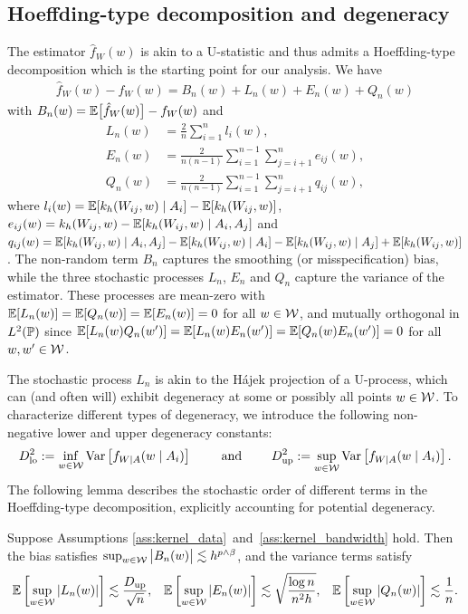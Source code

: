 \subsection{Hoeffding-type decomposition and degeneracy}
\label{sec:degeneracy}

The estimator $\hat{f}_W(w)$ is akin to a
U-statistic and thus admits a Hoeffding-type decomposition
which is the starting point for our analysis. We have
%
\begin{align}\label{eq:h-decomposition}
  \hat{f}_W(w) - f_W(w) = B_n(w) + L_n(w) + E_n(w) + Q_n(w)
\end{align}
%
with
$B_n(w) = \E\big[\hat{f}_W(w)\big] - f_W(w)$
and
%
\begin{align*}
  L_n(w)
  &= \frac{2}{n} \sum_{i=1}^n l_i(w), \\
  E_n(w)
  &=
  \frac{2}{n(n-1)} \sum_{i=1}^{n-1} \sum_{j=i+1}^{n} e_{i j}(w), \\
  Q_n(w)
  &=
  \frac{2}{n(n-1)} \sum_{i=1}^{n-1} \sum_{j=i+1}^{n} q_{i j}(w),
\end{align*}
%
where
$l_i(w) = \E[k_h(W_{i j},w) \mid A_i] - \E[k_h(W_{i j},w)]$,
$e_{i j}(w) = k_h(W_{i j},w) - \E[k_h(W_{i j},w) \mid A_i, A_j]$
and
$q_{i j}(w) = \E[k_h(W_{i j},w) \mid A_i, A_j] - \E[k_h(W_{i j},w) \mid A_i]
- \E[k_h(W_{i j},w) \mid A_j] + \E[k_h(W_{i j},w)]$.
The non-random term $B_n$ captures the smoothing (or misspecification) bias,
while the three stochastic processes $L_n$, $E_n$ and $Q_n$
capture the variance of the estimator.
These processes are
mean-zero with $\E[L_n(w)] = \E[Q_n(w)] = \E[E_n(w)] = 0$ for all $w \in \cW$,
and mutually orthogonal in $L^2(\P)$ since
$\E[L_n(w) Q_n(w')] = \E[L_n(w) E_n(w')] = \E[Q_n(w) E_n(w')] = 0$
for all $w, w' \in \cW$.

The stochastic process $L_n$ is akin to the H\'{a}jek projection of a U-process,
which can (and often will) exhibit degeneracy at some
or possibly all points $w \in \cW$.
To characterize different types of degeneracy,
we introduce the following non-negative lower and upper degeneracy constants:
%
\[
  \Dl^2 := \inf_{w \in \cW} \Var\left[f_{W \mid A}(w \mid A_i)\right]
  \qquad \text{ and } \qquad
  \Du^2 := \sup_{w \in \cW} \Var\left[f_{W \mid A}(w \mid A_i)\right].
\]
%
The following lemma describes the stochastic order of
different terms in the Hoeffding-type decomposition,
explicitly accounting for potential degeneracy.

\begin{lemma} \label{lem:variance}
  Suppose Assumptions \ref{ass:kernel_data}~and~\ref{ass:kernel_bandwidth}
  hold. Then the bias satisfies
  $\sup_{w \in \cW} \big| B_n(w) \big| \lesssim h^{p\wedge\beta}$,
  and the variance terms satisfy
  \begin{align*}
    \E\left[ \sup_{w \in \cW} |L_n(w)| \right]
    &\lesssim
    \frac{\Du}{\sqrt n},
    &
    \E\left[ \sup_{w \in \cW} |E_n(w)| \right]
    &\lesssim \sqrt{\frac{\log n}{n^2h}},
    &
    \E\left[ \sup_{w \in \cW} |Q_n(w)| \right]
    \lesssim \frac{1}{n}.
  \end{align*}
\end{lemma}

